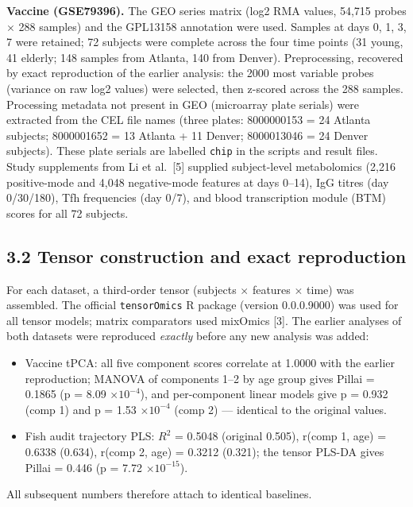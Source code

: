 \documentclass[
]{article}
\providecommand{\tightlist}{%
  \setlength{\itemsep}{0pt}\setlength{\parskip}{0pt}}
\begin{document}
\textbf{Vaccine (GSE79396).} The GEO series matrix (log2 RMA values,
54,715 probes \(\times\) 288 samples) and the GPL13158 annotation were
used. Samples at days 0, 1, 3, 7 were retained; 72 subjects were
complete across the four time points (31 young, 41 elderly; 148 samples
from Atlanta, 140 from Denver). Preprocessing, recovered by exact
reproduction of the earlier analysis: the 2000 most variable probes
(variance on raw log2 values) were selected, then z-scored across the
288 samples. Processing metadata not present in GEO (microarray plate
serials) were extracted from the CEL file names (three plates:
8000000153 = 24 Atlanta subjects; 8000001652 = 13 Atlanta + 11 Denver;
8000013046 = 24 Denver subjects). These plate serials are labelled
\texttt{chip} in the scripts and result files. Study supplements from Li
et al.~{[}5{]} supplied subject-level metabolomics (2,216 positive-mode
and 4,048 negative-mode features at days 0--14), IgG titres (day
0/30/180), Tfh frequencies (day 0/7), and blood transcription module
(BTM) scores for all 72 subjects.

\subsection{3.2 Tensor construction and exact
reproduction}\label{tensor-construction-and-exact-reproduction}

For each dataset, a third-order tensor (subjects \(\times\) features
\(\times\) time) was assembled. The official \texttt{tensorOmics} R
package (version 0.0.0.9000) was used for all tensor models; matrix
comparators used mixOmics {[}3{]}. The earlier analyses of both datasets
were reproduced \emph{exactly} before any new analysis was added:

\begin{itemize}
\tightlist
\item
  Vaccine tPCA: all five component scores correlate at 1.0000 with the
  earlier reproduction; MANOVA of components 1--2 by age group gives
  Pillai = 0.1865 (p = 8.09 \(\times 10^{-4}\)), and per-component
  linear models give p = 0.932 (comp 1) and p = 1.53 \(\times 10^{-4}\)
  (comp 2) --- identical to the original values.
\item
  Fish audit trajectory PLS: \(R^2\) = 0.5048 (original 0.505), r(comp
  1, age) = 0.6338 (0.634), r(comp 2, age) = 0.3212 (0.321); the tensor
  PLS-DA gives Pillai = 0.446 (p = 7.72 \(\times 10^{-15}\)).
\end{itemize}

All subsequent numbers therefore attach to identical baselines.
\end{document}
